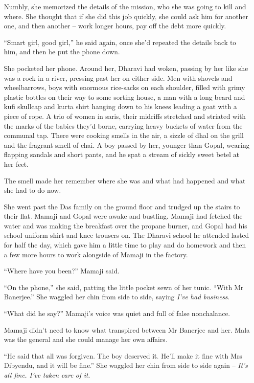 Numbly, she memorized the details of the mission, who she was going
to kill and where. She thought that if she did this job quickly,
she could ask him for another one, and then another -- work longer
hours, pay off the debt more quickly.

``Smart girl, good girl,'' he said again, once she'd repeated the
details back to him, and then he put the phone down.

She pocketed her phone. Around her, Dharavi had woken, passing by
her like she was a rock in a river, pressing past her on either
side. Men with shovels and wheelbarrows, boys with enormous
rice-sacks on each shoulder, filled with grimy plastic bottles on
their way to some sorting house, a man with a long beard and kufi
skullcap and kurta shirt hanging down to his knees leading a goat
with a piece of rope. A trio of women in saris, their midriffs
stretched and striated with the marks of the babies they'd borne,
carrying heavy buckets of water from the communal tap. There were
cooking smells in the air, a sizzle of dhal on the grill and the
fragrant smell of chai. A boy passed by her, younger than Gopal,
wearing flapping sandals and short pants, and he spat a stream of
sickly sweet betel at her feet.

The smell made her remember where she was and what had happened and
what she had to do now.

She went past the Das family on the ground floor and trudged up the
stairs to their flat. Mamaji and Gopal were awake and bustling.
Mamaji had fetched the water and was making the breakfast over the
propane burner, and Gopal had his school uniform shirt and
knee-trousers on. The Dharavi school he attended lasted for half
the day, which gave him a little time to play and do homework and
then a few more hours to work alongside of Mamaji in the factory.

``Where have you been?'' Mamaji said.

``On the phone,'' she said, patting the little pocket sewn of her
tunic. ``With Mr Banerjee.'' She waggled her chin from side to side,
saying \emph{I've had business}.

``What did he say?'' Mamaji's voice was quiet and full of false
nonchalance.

Mamaji didn't need to know what transpired between Mr Banerjee and
her. Mala was the general and she could manage her own affairs.

``He said that all was forgiven. The boy deserved it. He'll make it
fine with Mrs Dibyendu, and it will be fine.'' She waggled her chin
from side to side again --
\emph{It's all fine. I've taken care of it}.

